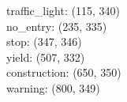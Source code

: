 traffic_light: (115, 340) \\
no_entry: (235, 335) \\
stop: (347, 346) \\
yield: (507, 332) \\
construction: (650, 350) \\
warning: (800, 349) \\
